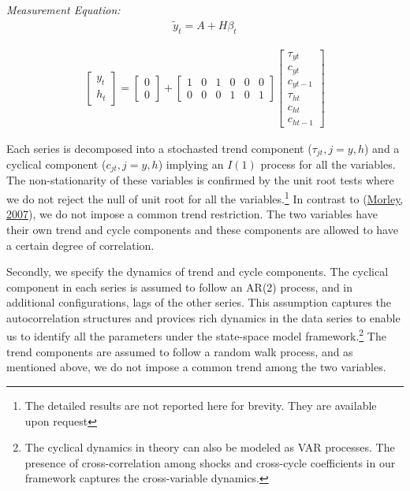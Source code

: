\documentclass[
  12pt,
]{article}
\begin{document}
        \bigskip
        \textit{Measurement Equation:}
        \begin{align}
        \tilde{y}_t = A + H\beta_t
        \end{align}
        
        \begin{align*}
        \begin{bmatrix}
        y_t \\
        h_t
        \end{bmatrix}
        =
        \begin{bmatrix}
        0   \\
        0
        \end{bmatrix}
        +
        \begin{bmatrix}
        1   & 0 & 1 & 0 & 0 & 0 \\
        0   & 0 & 0 & 1 & 0 & 1
        \end{bmatrix}
        \begin{bmatrix}
        \tau_{yt}   \\
        c_{yt}      \\
        c_{yt-1}    \\
        \tau_{ht}   \\
        c_{ht}      \\
        c_{ht-1}
        \end{bmatrix}
        \end{align*}

Each series is decomposed into a stochasted trend component (\(\tau_{jt}, j = y, h\)) and a cyclical component (\(c_{jt}, j = y, h\)) implying an \(I(1)\) process for all the variables. The non-stationarity of these variables is confirmed by the unit root tests where we do not reject the null of unit root for all the variables.\footnote{The detailed results are not reported here for brevity. They are available upon request} In contrast to (\protect\hyperlink{ref-morley_slow_2007}{Morley, 2007}), we do not impose a common trend restriction. The two variables have their own trend and cycle components and these components are allowed to have a certain degree of correlation.

Secondly, we specify the dynamics of trend and cycle components. The cyclical component in each series is assumed to follow an AR(2) process, and in additional configurations, lags of the other series. This assumption captures the autocorrelation structures and provices rich dynamics in the data series to enable us to identify all the parameters under the state-space model framework.\footnote{The cyclical dynamics in theory can also be modeled as VAR processes. The presence of cross-correlation among shocks and cross-cycle coefficients in our framework captures the cross-variable dynamics.} The trend components are assumed to follow a random walk process, and as mentioned above, we do not impose a common trend among the two variables.
\end{document}
